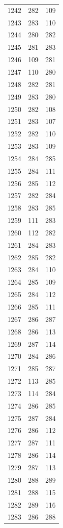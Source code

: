 \documentclass[a4paper,11pt]{article}
\begin{document}
\begin{center}
\begin{longtable}{|R{1.5cm}|R{1.5cm}|R{1.5cm}|}
 1242 &  282 &  109 \\
 1243 &  283 &  110 \\
 1244 &  280 &  282 \\
 1245 &  281 &  283 \\
 1246 &  109 &  281 \\
 1247 &  110 &  280 \\
 1248 &  282 &  281 \\
 1249 &  283 &  280 \\
 1250 &  282 &  108 \\
 1251 &  283 &  107 \\
 1252 &  282 &  110 \\
 1253 &  283 &  109 \\
 1254 &  284 &  285 \\
 1255 &  284 &  111 \\
 1256 &  285 &  112 \\
 1257 &  282 &  284 \\
 1258 &  283 &  285 \\
 1259 &  111 &  283 \\
 1260 &  112 &  282 \\
 1261 &  284 &  283 \\
 1262 &  285 &  282 \\
 1263 &  284 &  110 \\
 1264 &  285 &  109 \\
 1265 &  284 &  112 \\
 1266 &  285 &  111 \\
 1267 &  286 &  287 \\
 1268 &  286 &  113 \\
 1269 &  287 &  114 \\
 1270 &  284 &  286 \\
 1271 &  285 &  287 \\
 1272 &  113 &  285 \\
 1273 &  114 &  284 \\
 1274 &  286 &  285 \\
 1275 &  287 &  284 \\
 1276 &  286 &  112 \\
 1277 &  287 &  111 \\
 1278 &  286 &  114 \\
 1279 &  287 &  113 \\
 1280 &  288 &  289 \\
 1281 &  288 &  115 \\
 1282 &  289 &  116 \\
 1283 &  286 &  288 \\

\end{longtable}
\end{center}
\end{document}
